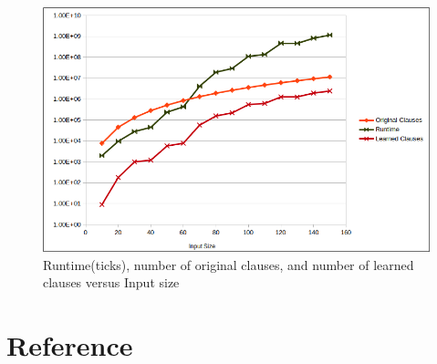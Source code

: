 \documentclass{article}
\begin{document}
    \begin{figure}[h]
        \begin{minipage}{0.99\textwidth}
        \centering
        \includegraphics[width=\textwidth]{img/graph.png}
        \caption{Runtime(ticks), number of original clauses, and number of learned clauses versus Input size}
        \label{fig:}
        \end{minipage}
    \end{figure}

    \section{Reference}
        
\end{document}
